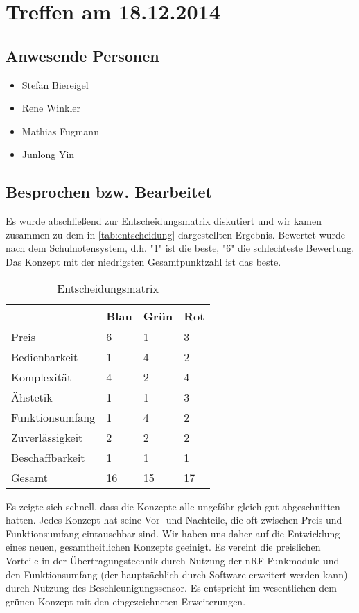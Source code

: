 \chapter{Treffen am 18.12.2014}
\section{Anwesende Personen}
\begin{itemize}
	\item Stefan Biereigel
	\item Rene Winkler
	\item Mathias Fugmann
	\item Junlong Yin
\end{itemize}

\section{Besprochen bzw. Bearbeitet}
Es wurde abschließend zur Entscheidungsmatrix diskutiert und wir kamen zusammen zu dem in \autoref{tab:entscheidung} dargestellten Ergebnis. Bewertet wurde nach dem Schulnotensystem, d.h. "1" ist die beste, "6" die schlechteste Bewertung. Das Konzept mit der niedrigsten Gesamtpunktzahl ist das beste.

\begin{table}[H]
\centering
\begin{tabular}{l|l|l|l}
 				& Blau 	& Grün 	& Rot	\\ \hline
Preis			& 6 	& 1		& 3		\\ \hline
Bedienbarkeit	& 1		& 4		& 2		\\ \hline
Komplexität		& 4		& 2		& 4		\\ \hline
Ähstetik		& 1		& 1		& 3		\\ \hline
Funktionsumfang	& 1		& 4		& 2		\\ \hline
Zuverlässigkeit	& 2		& 2		& 2		\\ \hline
Beschaffbarkeit	& 1		& 1		& 1		\\ \hline \hline
Gesamt			& 16	& 15	& 17	\\ \hline
\end{tabular}
\caption{Entscheidungsmatrix}
\label{tab:entscheidung}
\end{table}

Es zeigte sich schnell, dass die Konzepte alle ungefähr gleich gut abgeschnitten hatten. Jedes Konzept hat seine Vor- und Nachteile, die oft zwischen Preis und Funktionsumfang eintauschbar sind. Wir haben uns daher auf die Entwicklung eines neuen, gesamtheitlichen Konzepts geeinigt. 
Es vereint die preislichen Vorteile in der Übertragungstechnik durch Nutzung der nRF-Funkmodule und den Funktionsumfang (der hauptsächlich durch Software erweitert werden kann) durch Nutzung des Beschleunigungssensor. Es entspricht im wesentlichen dem grünen Konzept mit den eingezeichneten Erweiterungen.